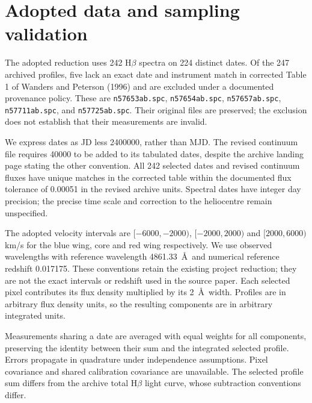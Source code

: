 \section{Adopted data and sampling validation}
\label{sec:adopted_sampling_update}

The adopted reduction uses 242 H$\beta$ spectra on 224 distinct dates. Of the 247 archived profiles, five lack an exact date and instrument match in corrected Table 1 of Wanders and Peterson (1996) and are excluded under a documented provenance policy. These are \texttt{n57653ab.spc}, \texttt{n57654ab.spc}, \texttt{n57657ab.spc}, \texttt{n57711ab.spc}, and \texttt{n57725ab.spc}. Their original files are preserved; the exclusion does not establish that their measurements are invalid.

We express dates as JD less 2400000, rather than MJD. The revised continuum file requires 40000 to be added to its tabulated dates, despite the archive landing page stating the other convention. All 242 selected dates and revised continuum fluxes have unique matches in the corrected table within the documented flux tolerance of 0.00051 in the revised archive units. Spectral dates have integer day precision; the precise time scale and correction to the heliocentre remain unspecified.

The adopted velocity intervals are $[-6000,-2000)$, $[-2000,2000)$ and $[2000,6000)$ km/s for the blue wing, core and red wing respectively. We use observed wavelengths with reference wavelength 4861.33~\AA\ and numerical reference redshift 0.017175. These conventions retain the existing project reduction; they are not the exact intervals or redshift used in the source paper. Each selected pixel contributes its flux density multiplied by its 2~\AA\ width. Profiles are in arbitrary flux density units, so the resulting components are in arbitrary integrated units.

Measurements sharing a date are averaged with equal weights for all components, preserving the identity between their sum and the integrated selected profile. Errors propagate in quadrature under independence assumptions. Pixel covariance and shared calibration covariance are unavailable. The selected profile sum differs from the archive total H$\beta$ light curve, whose subtraction conventions differ.


